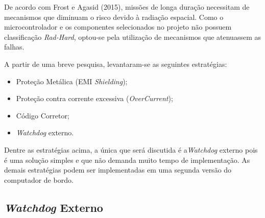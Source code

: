 De acordo com  Frost e Agasid (2015), missões de longa duração necessitam de mecanismos que diminuam o risco devido à radiação espacial. Como o microcontrolador e os componentes selecionados no projeto não possuem classificação \textit{Rad-Hard}, optou-se pela utilização de mecanismos que atenuassem as falhas. 

A partir de uma breve pesquisa, levantaram-se as seguintes estratégias:
\begin{itemize}
	\item Proteção Metálica (EMI \textit{Shielding});
	\item Proteção contra corrente excessiva (\textit{OverCurrent});
	\item Código Corretor;
	\item \textit{Watchdog} externo.
\end{itemize}

Dentre as estratégias acima, a única que será discutida é a\textit{Watchdog} externo pois é uma solução simples e que não demanda muito tempo de implementação. As demais estratégias podem ser implementadas em uma segunda versão do computador de bordo.

\subsection{\textit{Watchdog} Externo}

